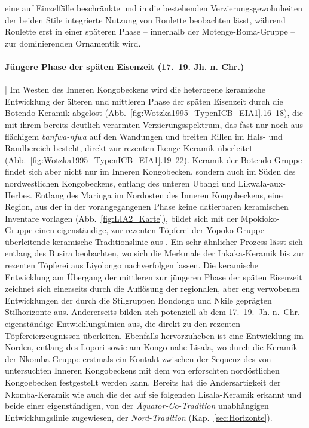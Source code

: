 eine auf Einzelfälle beschränkte und in die bestehenden Verzierungsgewohnheiten der beiden Stile integrierte Nutzung von \mbox{Roulette} beobachten lässt, während \mbox{Roulette} erst in einer späteren Phase -- innerhalb der Motenge-Boma-Gruppe -- zur dominierenden Ornamentik wird.

\paragraph{Jüngere Phase der späten Eisenzeit (17.--19. Jh. n. Chr.)}\hspace{-.5em}|\hspace{.5em}%
Im Westen des Inneren Kongobeckens wird die heterogene keramische Entwicklung der älteren und mittleren Phase der späten Eisenzeit durch die Botendo-Keramik abgelöst (Abb.~\ref{fig:Wotzka1995_TypenICB_EIA1}.16--18), die mit ihrem bereits deutlich verarmten Verzierungsspektrum, das fast nur noch aus flächigem \textit{banfwa-nfwa} auf den Wandungen und breiten Rillen im Hals- und Randbereich besteht, direkt zur rezenten Ikenge-Keramik überleitet (Abb.~\ref{fig:Wotzka1995_TypenICB_EIA1}.19--22). Keramik der Botendo-Gruppe findet sich aber nicht nur im Inneren Kongobecken, sondern auch im Süden des nordwestlichen Kongobeckens, entlang des unteren \mbox{Ubangi} und Likwala-aux-Herbes. Entlang des Maringa im Nordosten des Inneren Kongobeckens, eine Region, aus der in der vorangegangenen Phase keine datierbaren keramischen Inventare vorlagen (Abb.~\ref{fig:LIA2_Karte}), bildet sich mit der Mpokioko-Gruppe einen eigenständige, zur rezenten Töpferei der Yopoko-Gruppe überleitende keramische Traditionslinie aus \parencite[223]{Wotzka.1995}. Ein sehr ähnlicher Prozess lässt sich entlang des Busira beobachten, wo sich die Merkmale der Inkaka-Keramik bis zur rezenten Töpferei aus Liyolongo nachverfolgen lassen. Die keramische Entwicklung am Übergang der mittleren zur jüngeren Phase der späten Eisenzeit zeichnet sich einerseits durch die Auflösung der regionalen, aber eng verwobenen Entwicklungen der durch die Stilgruppen Bondongo und Nkile geprägten Stilhorizonte aus. Andererseits bilden sich potenziell ab dem 17.--19.~Jh. n.~Chr. eigenständige Entwicklungslinien aus, die direkt zu den rezenten Töpfereierzeugnissen überleiten. Ebenfalls hervorzuheben ist eine Entwicklung im Norden, entlang des Lopori sowie am Kongo nahe Lisala, wo durch die Keramik der Nkomba-Gruppe erstmals ein Kontakt zwischen der Sequenz des von \textcite{Wotzka.1995} untersuchten Inneren Kongobeckens mit dem von \textcite{LivingstoneSmith.2017} erforschten nordöstlichen Kongoebecken festgestellt werden kann. Bereits \textcite[223\,f.]{Wotzka.1995} hat die Andersartigkeit der Nkomba-Keramik wie auch die der auf sie folgenden Lisala-Keramik erkannt und beide einer eigenständigen, von der \textit{Äquator-Co-Tradition} unabhängigen Entwicklungslinie zugewiesen, der \textit{Nord-Tradition} (Kap.~\ref{sec:Horizonte}).

